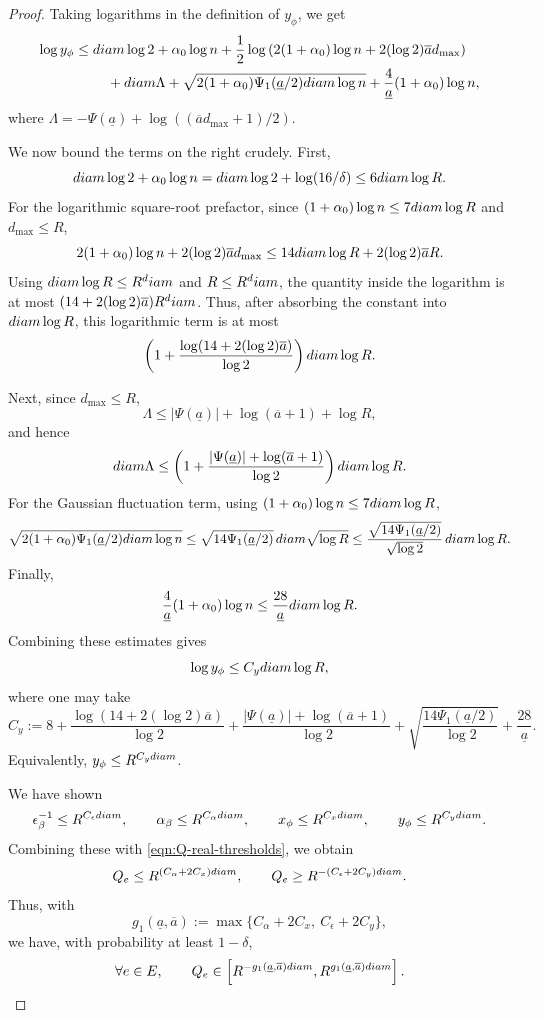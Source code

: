 \documentclass[10pt,a4paper]{amsart}
\newcommand{\diam}{\textnormal{diam}}
\begin{document}
\begin{proof}
Taking logarithms in the definition of \(y_\phi\), we get
\[
\begin{aligned}
\log y_\phi
\le{}&
\diam\log2+\alpha_0\log n
+\frac12\log\left(2(1+\alpha_0)\log n+2(\log2)\overline a d_{\max}\right) \\
&\quad
+\diam\Lambda
+\sqrt{2(1+\alpha_0)\Psi_1(\underline a/2)\diam\log n}
+\frac{4}{\underline a}(1+\alpha_0)\log n ,
\end{aligned}
\]
where \(\Lambda=-\Psi(\underline a)+\log((\overline a d_{\max}+1)/2)\).

We now bound the terms on the right crudely. First,
\[
\diam\log2+\alpha_0\log n
=
\diam\log2+\log(16/\delta)
\le6\diam\log R.
\]
For the logarithmic square-root prefactor, since \((1+\alpha_0)\log n\le7\diam\log R\) and \(d_{\max}\le R\),
\[
2(1+\alpha_0)\log n+2(\log2)\overline a d_{\max}
\le
14\diam\log R+2(\log2)\overline a R.
\]
Using \(\diam\log R\le R^\diam\) and \(R\le R^\diam\), the quantity inside the logarithm is at most
\((14+2(\log2)\overline a)R^\diam\). Thus, after absorbing the constant into
\(\diam\log R\), this logarithmic term is at most
\[
\left(1+\frac{\log(14+2(\log2)\overline a)}{\log2}\right)\diam\log R.
\]

Next, since \(d_{\max}\le R\),
\[
\Lambda\le |\Psi(\underline a)|+\log(\overline a+1)+\log R,
\]
and hence
\[
\diam\Lambda
\le
\left(
1+\frac{|\Psi(\underline a)|+\log(\overline a+1)}{\log2}
\right)\diam\log R.
\]
For the Gaussian fluctuation term, using \((1+\alpha_0)\log n\le7\diam\log R\),
\[
\sqrt{2(1+\alpha_0)\Psi_1(\underline a/2)\diam\log n}
\le
\sqrt{14\Psi_1(\underline a/2)}\,\diam\sqrt{\log R}
\le
\frac{\sqrt{14\Psi_1(\underline a/2)}}{\sqrt{\log2}}\,\diam\log R.
\]
Finally,
\[
\frac{4}{\underline a}(1+\alpha_0)\log n
\le
\frac{28}{\underline a}\diam\log R.
\]
Combining these estimates gives
\[
\log y_\phi\le C_y\diam\log R,
\]
where one may take
\[
C_y
:=
8
+
\frac{\log(14+2(\log2)\overline a)}{\log2}
+
\frac{|\Psi(\underline a)|+\log(\overline a+1)}{\log2}
+
\sqrt{\frac{14\Psi_1(\underline a/2)}{\log2}}
+
\frac{28}{\underline a}.
\]
Equivalently, \(y_\phi\le R^{C_y\diam}\).

We have shown
\[
\epsilon_\beta^{-1}\le R^{C_\epsilon\diam},
\qquad
\alpha_\beta\le R^{C_\alpha\diam},
\qquad
x_\phi\le R^{C_x\diam},
\qquad
y_\phi\le R^{C_y\diam}.
\]
Combining these with \eqref{eqn:Q-real-thresholds}, we obtain
\[
Q_e\le R^{(C_\alpha+2C_x)\diam},
\qquad
Q_e\ge R^{-(C_\epsilon+2C_y)\diam}.
\]
Thus, with
\[
g_1(\underline a,\overline a)
:=
\max\{C_\alpha+2C_x,\ C_\epsilon+2C_y\},
\]
we have, with probability at least \(1-\delta\),
\[
\forall e\in E,\qquad
Q_e\in
\left[
R^{-g_1(\underline a,\overline a)\diam},
R^{g_1(\underline a,\overline a)\diam}
\right].
\]


\end{proof}
\end{document}
